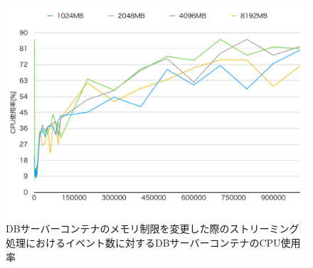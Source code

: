 \documentclass[../../../../../main]{subfiles}
\begin{document}
    \begin{figure}[H]
        \centering
        \includegraphics[width=12cm]{graph}
        \caption{DBサーバーコンテナのメモリ制限を変更した際のストリーミング処理におけるイベント数に対するDBサーバーコンテナのCPU使用率}
        \label{fig:stream-change-db-memory-limit-db-cpu-app_4_8192-db_400}
    \end{figure}
\end{document}

